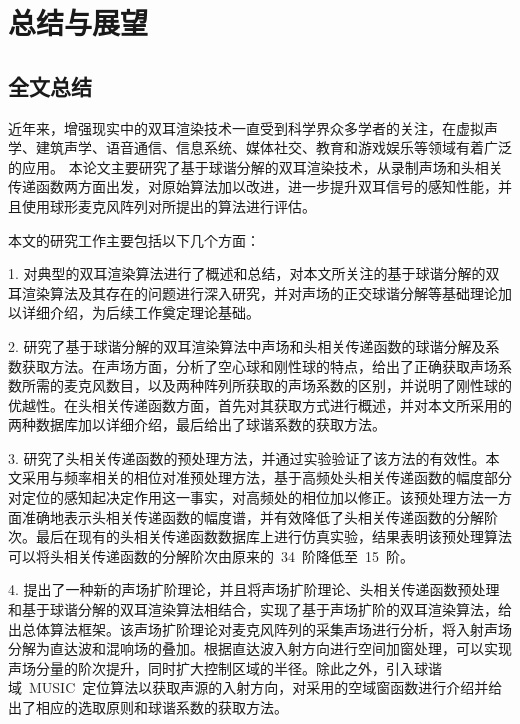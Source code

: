 \chapter{ 总结与展望  }

\section{全文总结}

近年来，增强现实中的双耳渲染技术一直受到科学界众多学者的关注，在虚拟声学、建筑声学、语音通信、信息系统、媒体社交、教育和游戏娱乐等领域有着广泛的应用。
本论文主要研究了基于球谐分解的双耳渲染技术，从录制声场和头相关传递函数两方面出发，对原始算法加以改进，进一步提升双耳信号的感知性能，并且使用球形麦克风阵列对所提出的算法进行评估。

本文的研究工作主要包括以下几个方面：

1. 对典型的双耳渲染算法进行了概述和总结，对本文所关注的基于球谐分解的双耳渲染算法及其存在的问题进行深入研究，并对声场的正交球谐分解等基础理论加以详细介绍，为后续工作奠定理论基础。

2. 研究了基于球谐分解的双耳渲染算法中声场和头相关传递函数的球谐分解及系数获取方法。在声场方面，分析了空心球和刚性球的特点，给出了正确获取声场系数所需的麦克风数目，以及两种阵列所获取的声场系数的区别，并说明了刚性球的优越性。在头相关传递函数方面，首先对其获取方式进行概述，并对本文所采用的两种数据库加以详细介绍，最后给出了球谐系数的获取方法。

3. 研究了头相关传递函数的预处理方法，并通过实验验证了该方法的有效性。本文采用与频率相关的相位对准预处理方法，基于高频处头相关传递函数的幅度部分对定位的感知起决定作用这一事实，对高频处的相位加以修正。该预处理方法一方面准确地表示头相关传递函数的幅度谱，并有效降低了头相关传递函数的分解阶次。最后在现有的头相关传递函数数据库上进行仿真实验，结果表明该预处理算法可以将头相关传递函数的分解阶次由原来的~34~阶降低至~15~阶。

4. 提出了一种新的声场扩阶理论，并且将声场扩阶理论、头相关传递函数预处理和基于球谐分解的双耳渲染算法相结合，实现了基于声场扩阶的双耳渲染算法，给出总体算法框架。该声场扩阶理论对麦克风阵列的采集声场进行分析，将入射声场分解为直达波和混响场的叠加。根据直达波入射方向进行空间加窗处理，可以实现声场分量的阶次提升，同时扩大控制区域的半径。除此之外，引入球谐域~MUSIC~定位算法以获取声源的入射方向，对采用的空域窗函数进行介绍并给出了相应的选取原则和球谐系数的获取方法。


